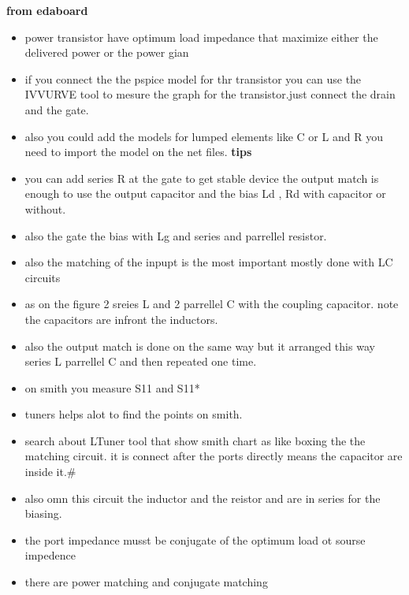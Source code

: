 \documentclass{article}
\begin{document}
\textbf{from edaboard}
\begin{itemize}
    \item power transistor have optimum load impedance that maximize either the delivered power or the power gian 
    \item if you connect the the pspice model for thr transistor  you can use the IVVURVE tool to mesure the graph for the transistor.just connect the drain and the gate.
    \item also you could add the models for lumped elements like C or L and R  you need to import the model on the net files.
    \textbf{tips}
    \item you can add series R at the gate to get stable device the output match is enough to use the output capacitor and the bias Ld , Rd with capacitor or without.
    \item also the gate the bias with Lg and series and parrellel resistor.
    \item also the matching of the inpupt is the most important mostly done with LC circuits 
    \item as on the figure 2 sreies L and 2 parrellel C with the coupling capacitor. note the capacitors are infront the inductors.
    \item also the output match is done on the same way but  it arranged this way series L  parrellel C and then repeated one time.
    \item on smith you measure S11 and S11* 
    \item tuners helps alot to find the points on smith.
    \item search about LTuner tool that show smith chart as like boxing the the matching circuit. it is connect after the ports directly means the capacitor are inside it.#
    \item also omn this circuit the inductor and the reistor and are in series for the biasing.
    \item the port impedance musst be conjugate of the optimum load ot sourse impedence
    \item there are power matching and conjugate matching
\end{itemize}
\end{document}
